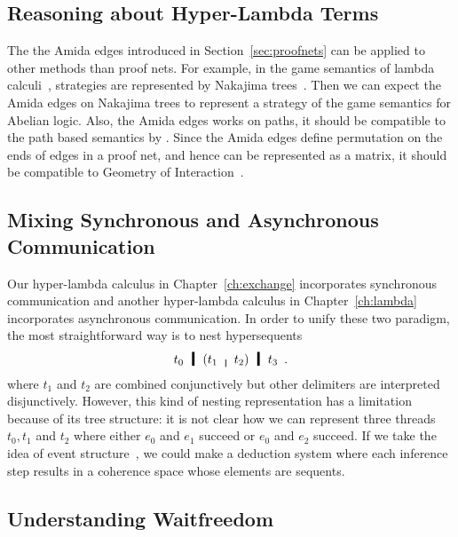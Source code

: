 
\subsection{Reasoning about Hyper-Lambda Terms}

The the Amida edges introduced in Section~\ref{sec:proofnets} can be applied
to other methods than proof nets.
For example, in the game semantics of lambda calculi~\citep{untyped},
strategies are represented by Nakajima trees~\citep{nakajima1975}.
Then we can expect the Amida edges on Nakajima trees to represent a
strategy of the game semantics for Abelian logic.
Also, the Amida edges works on paths, it should be compatible to the path
based semantics by \citet{danos-regnier}.
Since the Amida edges define permutation on the ends of edges in a proof
net, and hence can be represented as a matrix, it should be compatible
to Geometry of Interaction~\citep{girard1989}.

\subsection{Mixing Synchronous and Asynchronous Communication}

Our hyper-lambda calculus in Chapter~\ref{ch:exchange} incorporates
synchronous communication and another hyper-lambda calculus in
Chapter~\ref{ch:lambda} incorporates asynchronous communication.
In order to unify these two paradigm, the most straightforward way is to
nest hypersequents
\[
 t_0\hmid (t_1 \whitemid t_2) \hmid t_3 \enspace.
\]
where $t_1$ and $t_2$ are combined conjunctively but other delimiters
are interpreted disjunctively.
However, this kind of nesting representation has a limitation because of
its tree structure: it is not clear how we can represent three threads
$t_0, t_1$ and $t_2$ where either $e_0$ and $e_1$ succeed or $e_0$ and
$e_2$ succeed.
If we take the idea of event structure~\citep{winskel1980},
we could make a deduction system where each inference step results in a
coherence space whose elements are sequents.

\subsection{Understanding Waitfreedom}

